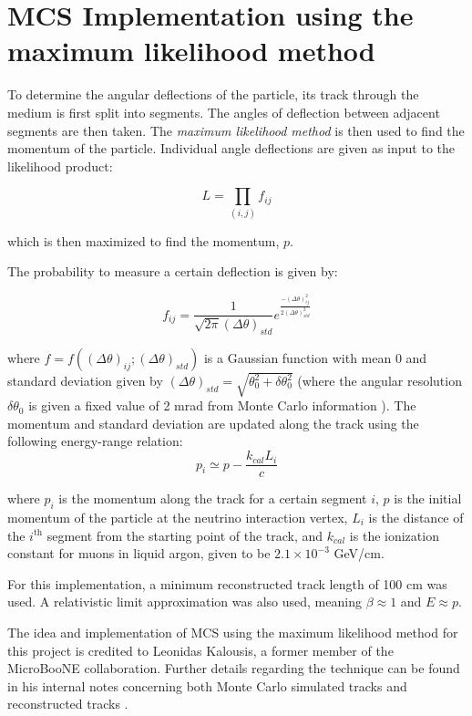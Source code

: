 \section{MCS Implementation using the maximum likelihood method}\label{MCS_technique_section}

To determine the angular deflections of the particle, its track through the medium is first split into segments. The angles of deflection between adjacent segments are then taken. The \emph{maximum likelihood method} is then used to find the momentum of the particle. Individual angle deflections are given as input to the likelihood product: 

\begin{equation}
	L=\prod_{(i,j)}f_{ij}
\end{equation} 

\noindent which is then maximized to find the momentum, $p$. 

The probability to measure a certain deflection is given by:

\begin{equation}
f_{ij}= \frac{1}{\sqrt{2\pi}(\Delta \theta)_{std}}e^{\frac{-(\Delta \theta)_{ij}^2}{2(\Delta \theta)_{std}^2}}
\end{equation}

\noindent where $f=f((\Delta \theta)_{ij};(\Delta \theta)_{std})$ is a Gaussian function with mean 0 and standard deviation given by $(\Delta \theta)_{std}=\sqrt{\theta_0^2+\delta \theta_0^2}$ (where the angular resolution $\delta \theta_0$ is given a fixed value of 2 mrad from Monte Carlo information \cite{leonidas2}). The momentum and standard deviation are updated along the track using the following energy-range relation: 
\begin{equation}
    p_i \simeq p - \frac{k_{cal}L_i}{c}
\end{equation}

\noindent where $p_i$ is the momentum along the track for a certain segment $i$, $p$ is the initial momentum of the particle at the neutrino interaction vertex, $L_i$ is the distance of the $i^{\text{th}}$ segment from the starting point of the track, and $k_{cal}$ is the ionization constant for muons in liquid argon, given to be $2.1 \times 10^{-3}$ GeV/cm.

For this implementation, a minimum reconstructed track length of 100 cm was used. A relativistic limit approximation was also used, meaning $\beta \approx 1$ and $E\approx p$. 

The idea and implementation of MCS using the maximum likelihood method for this project is credited to Leonidas Kalousis, a former member of the MicroBooNE collaboration.  Further details regarding the technique can be found in his internal notes concerning both Monte Carlo simulated tracks \cite{leonidas1} and reconstructed tracks \cite{leonidas2}. 

